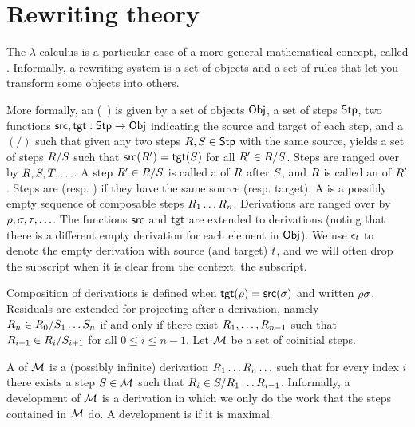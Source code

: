 \section{Rewriting theory}
The $\lambda$-calculus is a particular case of a more general mathematical concept, called .
Informally, a rewriting system is a set of objects and a set of rules that let you transform some objects into others.

More formally, an  (\cf~\cite[Def.~2.1]{thesismellies})
is given by a set of objects $\mathsf{Obj}$, a set of steps $\mathsf{Stp}$,
two functions $\mathsf{src},\mathsf{tgt} : \mathsf{Stp} \to \mathsf{Obj}$ indicating the source and target of each step,
and a  $(/)$ such that given any two steps $R,S \in \mathsf{Stp}$
with the same source, yields a set of steps $R/S$ such that $\mathsf{src}(R') = \mathsf{tgt}(S)$
for all $R' \in R/S$.
Steps are ranged over by $R,S,T,\hdots$.
A step $R' \in R/S$ is called a  of $R$ after $S$,
and $R$ is called an  of $R'$.
Steps are  (resp. ) if they have the same source (resp. target).
A  is a possibly empty sequence of composable steps $R_1\hdots R_n$.
Derivations are ranged over by $\rho,\sigma,\tau,\hdots$.
The functions $\mathsf{src}$ and $\mathsf{tgt}$ are extended to derivations (noting that there is a different empty derivation for each element in $\mathsf{Obj}$).
We use $\epsilon_t$ to denote the empty derivation with source (and target) $t$, and we will often drop the subscript when it is clear from the context.
the subscript.

Composition of derivations is defined when $\mathsf{tgt}(\rho) = \mathsf{src}(\sigma)$ and written $\rho\sigma$.
Residuals are extended for projecting after a derivation,
namely $R_n \in R_0/S_1\hdots S_n$
if and only if there exist $R_1,\hdots,R_{n-1}$
such that $R_{i+1} \in R_i/S_{i+1}$ for all $0 \leq i \leq n - 1$.
Let $\mathcal{M}$ be a set of coinitial steps.

A  of $\mathcal{M}$ is a (possibly infinite) derivation $R_1\hdots R_n\hdots$
such that for every index $i$ there exists a step $S \in \mathcal{M}$
such that $R_i \in S/R_1\hdots R_{i-1}$.
Informally, a development of $\mathcal{M}$ is a derivation in which we only
do the work that the steps contained in $\mathcal{M}$ do.
A development is  if it is maximal.

